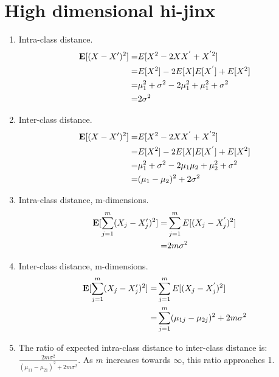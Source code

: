 \section{High dimensional hi-jinx}
\begin{enumerate}
\item Intra-class distance. \begin{align*}
\mathbf{E}[(X-X')^{2}]= & E[X^{2}-2XX^{'}+X^{'2}]\\
= & E[X^{2}]-2E[X]E[X^{'}]+E[X^{2}]\\
= & \mu_{1}^{2}+\sigma^{2}-2\mu_{1}^{2}+\mu_{1}^{2}+\sigma^{2}\\
= & 2\sigma^{2}\end{align*}

\item Inter-class distance. \begin{align*}
\mathbf{E}[(X-X')^{2}]= & E[X^{2}-2XX^{'}+X^{'2}]\\
= & E[X^{2}]-2E[X]E[X^{'}]+E[X^{2}]\\
= & \mu_{1}^{2}+\sigma^{2}-2\mu_{1}\mu_{2}+\mu_{2}^{2}+\sigma^{2}\\
= & (\mu_{1}-\mu_{2})^{2}+2\sigma^{2}\end{align*}

\item Intra-class distance, m-dimensions. \begin{align*}
\mathbf{E}[\sum_{j=1}^{m}(X_{j}-X'_{j})^{2}]= & \sum_{j=1}^{m}E[(X_{j}-X_{j}^{'})^{2}]\\
= & 2m\sigma^{2}\end{align*}

\item Inter-class distance, m-dimensions. \begin{align*}
\mathbf{E}[\sum_{j=1}^{m}(X_{j}-X'_{j})^{2}]= & \sum_{j=1}^{m}E[(X_{j}-X_{j}^{'})^{2}]\\
= & \sum_{j=1}^{m}(\mu_{1j}-\mu_{2j})^{2}+2m\sigma^{2}\end{align*}

\item The ratio of expected intra-class distance to inter-class distance
is: $\frac{2m\sigma^{2}}{(\mu_{11}-\mu_{21})^{2}+2m\sigma^{2}}$.
As $m$ increases towards $\infty$, this ratio approaches 1. 
\end{enumerate}

